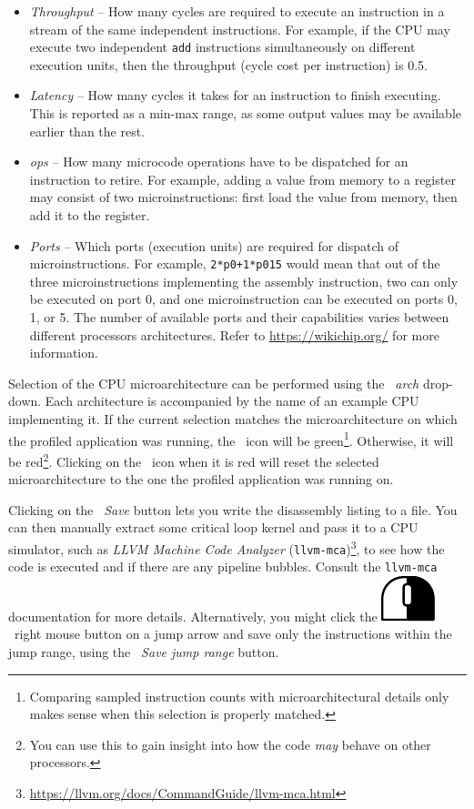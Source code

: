 \documentclass[hidelinks,titlepage,a4paper]{article}
\newcommand{\RMB}{\includegraphics[height=.8\baselineskip]{icons/rmb}}
\begin{document}
\begin{itemize}
\item \emph{Throughput} -- How many cycles are required to execute an instruction in a stream of the same independent instructions. For example, if the CPU may execute two independent \texttt{add} instructions simultaneously on different execution units, then the throughput (cycle cost per instruction) is 0.5.
\item \emph{Latency} -- How many cycles it takes for an instruction to finish executing. This is reported as a min-max range, as some output values may be available earlier than the rest.
\item \emph{\textmu{}ops} -- How many microcode operations have to be dispatched for an instruction to retire. For example, adding a value from memory to a register may consist of two microinstructions: first load the value from memory, then add it to the register.
\item \emph{Ports} -- Which ports (execution units) are required for dispatch of microinstructions. For example, \texttt{2*p0+1*p015} would mean that out of the three microinstructions implementing the assembly instruction, two can only be executed on port 0, and one microinstruction can be executed on ports 0, 1, or 5. The number of available ports and their capabilities varies between different processors architectures. Refer to \url{https://wikichip.org/} for more information.
\end{itemize}

Selection of the CPU microarchitecture can be performed using the \emph{\faMicrochip{}~\textmu{}arch} drop-down. Each architecture is accompanied by the name of an example CPU implementing it. If the current selection matches the microarchitecture on which the profiled application was running, the \faMicrochip{}~icon will be green\footnote{Comparing sampled instruction counts with microarchitectural details only makes sense when this selection is properly matched.}. Otherwise, it will be red\footnote{You can use this to gain insight into how the code \emph{may} behave on other processors.}. Clicking on the \faMicrochip{}~icon when it is red will reset the selected microarchitecture to the one the profiled application was running on.

Clicking on the \emph{\faFileImport{}~Save} button lets you write the disassembly listing to a file. You can then manually extract some critical loop kernel and pass it to a CPU simulator, such as \emph{LLVM Machine Code Analyzer} (\texttt{llvm-mca})\footnote{\url{https://llvm.org/docs/CommandGuide/llvm-mca.html}}, to see how the code is executed and if there are any pipeline bubbles. Consult the \texttt{llvm-mca} documentation for more details. Alternatively, you might click the \RMB{}~right mouse button on a jump arrow and save only the instructions within the jump range, using the \emph{\faFileImport{}~Save jump range} button.
\end{document}
